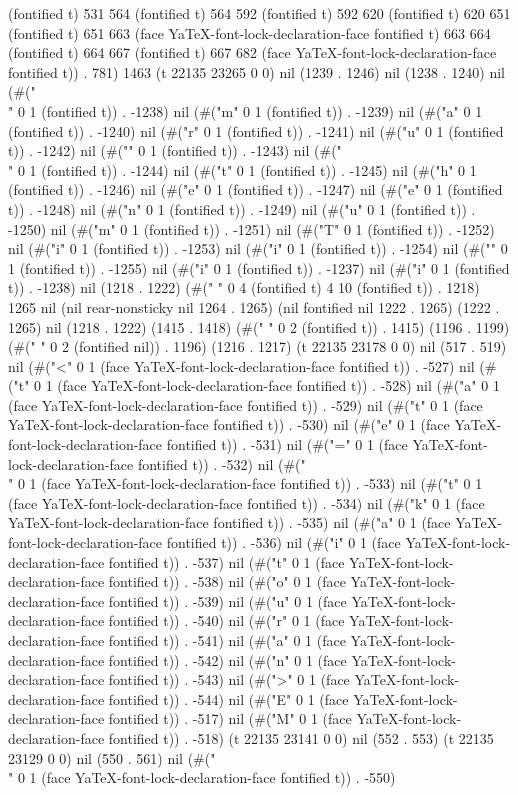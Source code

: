 (fontified t) 531 564 (fontified t) 564 592 (fontified t) 592 620 (fontified t) 620 651 (fontified t) 651 663 (face YaTeX-font-lock-declaration-face fontified t) 663 664 (fontified t) 664 667 (fontified t) 667 682 (face YaTeX-font-lock-declaration-face fontified t)) . 781) 1463 (t 22135 23265 0 0) nil (1239 . 1246) nil (1238 . 1240) nil (#("\\" 0 1 (fontified t)) . -1238) nil (#("m" 0 1 (fontified t)) . -1239) nil (#("a" 0 1 (fontified t)) . -1240) nil (#("r" 0 1 (fontified t)) . -1241) nil (#("u" 0 1 (fontified t)) . -1242) nil (#("{" 0 1 (fontified t)) . -1243) nil (#("\\" 0 1 (fontified t)) . -1244) nil (#("t" 0 1 (fontified t)) . -1245) nil (#("h" 0 1 (fontified t)) . -1246) nil (#("e" 0 1 (fontified t)) . -1247) nil (#("e" 0 1 (fontified t)) . -1248) nil (#("n" 0 1 (fontified t)) . -1249) nil (#("u" 0 1 (fontified t)) . -1250) nil (#("m" 0 1 (fontified t)) . -1251) nil (#("T" 0 1 (fontified t)) . -1252) nil (#("i" 0 1 (fontified t)) . -1253) nil (#("i" 0 1 (fontified t)) . -1254) nil (#("}" 0 1 (fontified t)) . -1255) nil (#("i" 0 1 (fontified t)) . -1237) nil (#("i" 0 1 (fontified t)) . -1238) nil (1218 . 1222) (#("          " 0 4 (fontified t) 4 10 (fontified t)) . 1218) 1265 nil (nil rear-nonsticky nil 1264 . 1265) (nil fontified nil 1222 . 1265) (1222 . 1265) nil (1218 . 1222) (1415 . 1418) (#("  " 0 2 (fontified t)) . 1415) (1196 . 1199) (#("  " 0 2 (fontified nil)) . 1196) (1216 . 1217) (t 22135 23178 0 0) nil (517 . 519) nil (#("<" 0 1 (face YaTeX-font-lock-declaration-face fontified t)) . -527) nil (#("t" 0 1 (face YaTeX-font-lock-declaration-face fontified t)) . -528) nil (#("a" 0 1 (face YaTeX-font-lock-declaration-face fontified t)) . -529) nil (#("t" 0 1 (face YaTeX-font-lock-declaration-face fontified t)) . -530) nil (#("e" 0 1 (face YaTeX-font-lock-declaration-face fontified t)) . -531) nil (#("=" 0 1 (face YaTeX-font-lock-declaration-face fontified t)) . -532) nil (#("\\" 0 1 (face YaTeX-font-lock-declaration-face fontified t)) . -533) nil (#("t" 0 1 (face YaTeX-font-lock-declaration-face fontified t)) . -534) nil (#("k" 0 1 (face YaTeX-font-lock-declaration-face fontified t)) . -535) nil (#("a" 0 1 (face YaTeX-font-lock-declaration-face fontified t)) . -536) nil (#("i" 0 1 (face YaTeX-font-lock-declaration-face fontified t)) . -537) nil (#("t" 0 1 (face YaTeX-font-lock-declaration-face fontified t)) . -538) nil (#("o" 0 1 (face YaTeX-font-lock-declaration-face fontified t)) . -539) nil (#("u" 0 1 (face YaTeX-font-lock-declaration-face fontified t)) . -540) nil (#("r" 0 1 (face YaTeX-font-lock-declaration-face fontified t)) . -541) nil (#("a" 0 1 (face YaTeX-font-lock-declaration-face fontified t)) . -542) nil (#("n" 0 1 (face YaTeX-font-lock-declaration-face fontified t)) . -543) nil (#(">" 0 1 (face YaTeX-font-lock-declaration-face fontified t)) . -544) nil (#("E" 0 1 (face YaTeX-font-lock-declaration-face fontified t)) . -517) nil (#("M" 0 1 (face YaTeX-font-lock-declaration-face fontified t)) . -518) (t 22135 23141 0 0) nil (552 . 553) (t 22135 23129 0 0) nil (550 . 561) nil (#("\\" 0 1 (face YaTeX-font-lock-declaration-face fontified t)) . -550) 